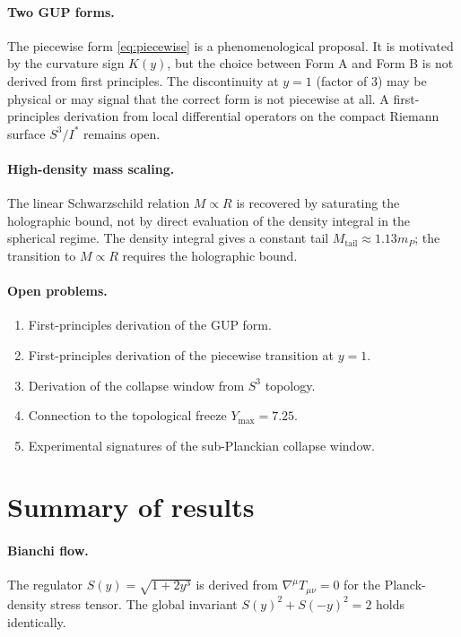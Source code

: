 \documentclass[a4paper,7pt,oneside,openany]{book}
\begin{document}
\paragraph{Two GUP forms.}
The piecewise form \eqref{eq:piecewise} is a phenomenological 
proposal. It is motivated by the curvature sign $K(y)$, but the 
choice between Form A and Form B is not derived from first 
principles. The discontinuity at $y=1$ (factor of $3$) may be 
physical or may signal that the correct form is not piecewise 
at all. A first-principles derivation from local differential 
operators on the compact Riemann surface $S^{3}/I^{*}$ remains 
open.

\paragraph{High-density mass scaling.}
The linear Schwarzschild relation $M\propto R$ is recovered by 
saturating the holographic bound, not by direct evaluation of 
the density integral in the spherical regime. The density 
integral gives a constant tail $M_{\text{tail}}\approx 
1.13 m_{P}$; the transition to $M\propto R$ requires the 
holographic bound.

\paragraph{Open problems.}
\begin{enumerate}
\item First-principles derivation of the GUP form.
\item First-principles derivation of the piecewise transition 
at $y=1$.
\item Derivation of the collapse window from $S^{3}$ topology.
\item Connection to the topological freeze $Y_{\max}=7.25$.
\item Experimental signatures of the sub-Planckian collapse 
window.
\end{enumerate}

\section{Summary of results}

\paragraph{Bianchi flow.}
The regulator $S(y)=\sqrt{1+2y^{3}}$ is derived from 
$\nabla^{\mu}T_{\mu\nu}=0$ for the Planck-density stress 
tensor. The global invariant 
$S(y)^{2}+S(-y)^{2}=2$ holds identically.
\end{document}
